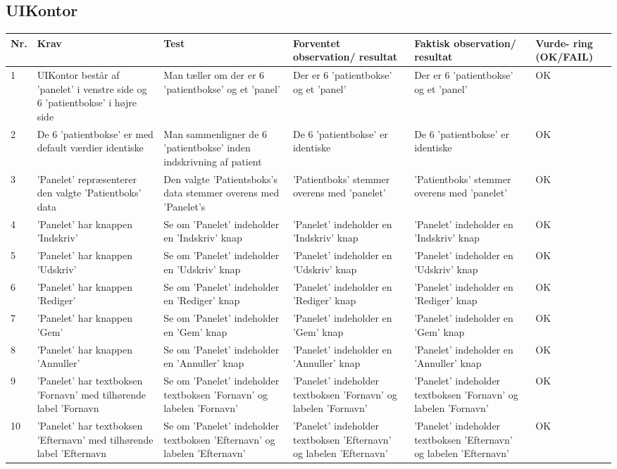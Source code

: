 \subsection{UIKontor}
\begin{table}[H]
\begin{tabular}{|p{0.5cm}|p{4cm}|p{3cm}|p{3cm}|p{3cm}|p{1cm}|}
\hline
\textbf{Nr.} & \textbf{Krav} & \textbf{Test}& \textbf{Forventet observation/ resultat}& \textbf{Faktisk observation/ resultat}& \textbf{Vurde- ring (OK/FAIL)}\\\hline
 1 & UIKontor består af 'panelet' i venstre side og 6 'patientbokse' i højre side & Man tæller om der er 6 'patientbokse' og et 'panel'& Der er 6 'patientbokse' og et 'panel' & Der er 6 'patientbokse' og et 'panel' & OK\\\hline
 2 & De 6 'patientbokse' er med default værdier identiske & Man sammenligner de 6 'patientbokse' inden indskrivning af patient & De 6 'patientbokse' er identiske & De 6 'patientbokse' er identiske & OK \\\hline
 3 & 'Panelet' repræsenterer den valgte 'Patientboks' data &Den valgte 'Patientsboks's data stemmer overens med 'Panelet's & 'Patientboks' stemmer overens med 'panelet' & 'Patientboks' stemmer overens med 'panelet' & OK \\\hline
 4 & 'Panelet' har knappen 'Indskriv' & Se om 'Panelet' indeholder en 'Indskriv' knap & 'Panelet' indeholder en 'Indskriv' knap & 'Panelet' indeholder en 'Indskriv' knap & OK \\\hline
 5 & 'Panelet' har knappen 'Udskriv' & Se om 'Panelet' indeholder en 'Udskriv' knap & 'Panelet' indeholder en 'Udskriv' knap & 'Panelet' indeholder en 'Udskriv' knap & OK \\\hline
 6 & 'Panelet' har knappen 'Rediger' & Se om 'Panelet' indeholder en 'Rediger' knap & 'Panelet' indeholder en 'Rediger' knap& 'Panelet' indeholder en 'Rediger' knap & OK \\\hline
 7 & 'Panelet' har knappen 'Gem' & Se om 'Panelet' indeholder en 'Gem' knap & 'Panelet' indeholder en 'Gem' knap & 'Panelet' indeholder en 'Gem' knap & OK \\\hline
  8 & 'Panelet' har knappen 'Annuller' & Se om 'Panelet' indeholder en 'Annuller' knap & 'Panelet' indeholder en 'Annuller' knap & 'Panelet' indeholder en 'Annuller' knap & OK \\\hline
 9 & 'Panelet' har textboksen 'Fornavn' med tilhørende label 'Fornavn & Se om 'Panelet' indeholder textboksen 'Fornavn' og labelen 'Fornavn' & 'Panelet' indeholder textboksen 'Fornavn' og labelen 'Fornavn' & 'Panelet' indeholder textboksen 'Fornavn' og labelen 'Fornavn' & OK \\\hline
  10 & 'Panelet' har textboksen 'Efternavn' med tilhørende label 'Efternavn & Se om 'Panelet' indeholder textboksen 'Efternavn' og labelen 'Efternavn' & 'Panelet' indeholder textboksen 'Efternavn' og labelen 'Efternavn' & 'Panelet' indeholder textboksen 'Efternavn' og labelen 'Efternavn'& OK \\\hline
 \end{tabular}
\end{table}
 
